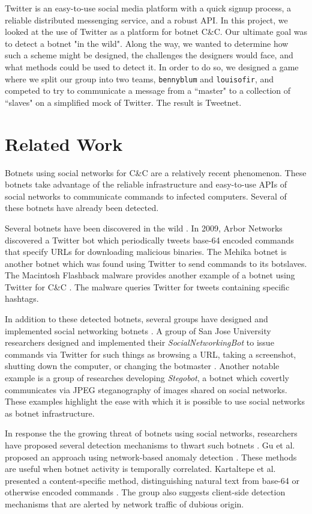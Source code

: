 \documentclass[11pt, oneside]{article} %
\numberwithin{equation}{section} %
\numberwithin{figure}{section} %
\numberwithin{table}{section} %
\renewcommand{\c}[1]{\texttt{#1}}
\newcommand{\teambb}{\c{bennyblum}}
\newcommand{\teamol}{\c{louisofir}}
\begin{document}
Twitter is an easy-to-use social media platform with a quick signup process, a reliable distributed messenging service, and a robust API. In this project, we looked at the use of Twitter as a platform for botnet C\&C. Our ultimate goal was to detect a botnet "in the wild". Along the way, we wanted to determine how such a scheme might be designed, the challenges the designers would face, and what methods could be used to detect it. In order to do so, we designed a game where we split our group into two teams, \teambb{} and \teamol{}, and competed to try to communicate a message from a ``master" to a collection of ``slaves" on a simplified mock of Twitter. The result is Tweetnet.

\section {Related Work}
Botnets using social networks for C\&C are a relatively recent phenomenon. These botnets take advantage of the reliable infrastructure and easy-to-use APIs of social networks to communicate commands to infected computers. Several of these botnets have already been detected.

Several botnets have been discovered in the wild \cite{arbor, trendmicro, flashback}. In 2009, Arbor Networks \cite{arbor} discovered a Twitter bot which periodically tweets base-64 encoded commands that specify URLs for downloading malicious binaries. The Mehika botnet \cite{trendmicro} is another botnet which was found using Twitter to send commands to its botslaves. The Macintosh Flashback malware provides another example of a botnet using Twitter for C\&C \cite{flashback}. The malware queries Twitter for tweets containing specific hashtags.

In addition to these detected botnets, several groups have designed and implemented social networking botnets \cite{socialnetworking, trojan7, stegobot}. A group of San Jose University researchers designed and implemented their \emph{SocialNetworkingBot} to issue commands via Twitter for such things as browsing a URL, taking a screenshot, shutting down the computer, or changing the botmaster \cite{socialnetworking}. Another notable example is a group of researches developing \emph{Stegobot}, a botnet which covertly communicates via JPEG steganography of images shared on social networks. These examples highlight the ease with which it is possible to use social networks as botnet infrastructure.

In response the the growing threat of botnets using social networks, researchers have proposed several detection mechanisms to thwart such botnets \cite{botsniffer, kartaltepe, burghouwt}. Gu et al. proposed an approach using network-based anomaly detection \cite{botsniffer}. These methods are useful when botnet activity is temporally correlated. Kartaltepe et al. presented a content-specific method, distinguishing natural text from base-64 or otherwise encoded commands \cite{kartaltepe}. The group also suggests client-side detection mechanisms that are alerted by network traffic of dubious origin.
\end{document}
